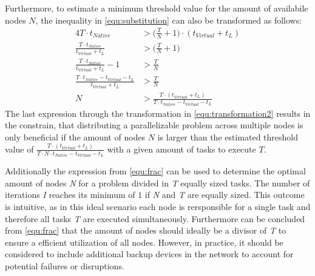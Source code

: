 Furthermore, to estimate a minimum threshold value for the amount of availabile nodes $N$, the inequality in \eqref{equ:substitution} can also be transformed as follows:
\begin{alignat}{4}
  T \cdot t_{Native} &> \bigg(\frac{T}{N} + 1\bigg) \cdot (t_{Virtual} + t_{L}) \nonumber \\
  \frac{T \cdot t_{Native}}{t_{Virtual} + t_{L}} &> \bigg(\frac{T}{N} + 1\bigg) \nonumber \\
  \frac{T \cdot t_{Native}}{t_{Virtual} + t_{L}} - 1 &> \frac{T}{N} \nonumber \\
  \frac{T \cdot t_{Native} - t_{Virtual} - t_{L}}{t_{Virtual} + t_{L}} &> \frac{T}{N} \nonumber \\
  N &> \frac{T \cdot (t_{Virtual} + t_{L})}{T \cdot t_{Native} - t_{Virtual} - t_{L}}
  \label{equ:transformation2}
\end{alignat}
The last expression through the transformation in \eqref{equ:transformation2} results in the constrain, that distributing a parallelizable problem across multiple nodes is only beneficial if the amount of nodes $N$ is larger than the estimated threshold value of $\frac{T \cdot (t_{Virtual} + t_{L})}{T \cdot N \cdot t_{Native} - t_{Virtual} - t_{L}}$ with a given amount of tasks to execute $T$.

Additionally the expression from \eqref{equ:frac} can be used to determine the optimal amount of nodes \emph{N} for a problem divided in \emph{T} equally sized tasks. The number of iterations \emph{I} reaches its minimum of $1$ if \emph{N} and \emph{T} are equally sized. This outcome is intuitive, as in this ideal scenario each node is rersponsible for a single task and therefore all tasks \emph{T} are executed simultaneously. Furthermore can be concluded from \eqref{equ:frac} that the amount of nodes should ideally be a divisor of \emph{T} to ensure a efficient utilization of all nodes. However, in practice, it should be considered to include additional backup devices in the network to account for potential failures or disruptions.


